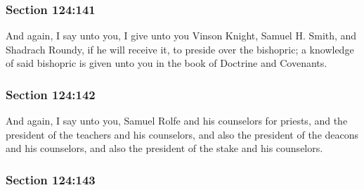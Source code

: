 
	\subsubsection{Section 124:141} %
		\label{DC124-141}

		And again, I say unto you, I give unto you Vinson Knight, Samuel H. Smith, and Shadrach Roundy, if he will receive it, to preside over the bishopric; a knowledge of said bishopric is given unto you in the book of Doctrine and Covenants.


	\subsubsection{Section 124:142} %
		\label{DC124-142}

		And again, I say unto you, Samuel Rolfe and his counselors for priests, and the president of the teachers and his counselors, and also the president of the deacons and his counselors, and also the president of the stake and his counselors.


	\subsubsection{Section 124:143} %
		\label{DC124-143}

